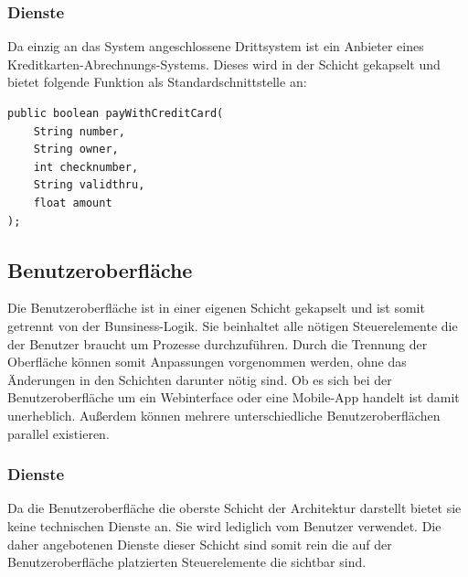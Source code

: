 \documentclass[a4paper,12pt]{article} %
\begin{document}
\subsubsection{Dienste}
Da einzig an das System angeschlossene Drittsystem ist ein Anbieter eines Kreditkarten-Abrechnungs-Systems. Dieses wird in der Schicht gekapselt und bietet folgende Funktion als Standardschnittstelle an:
\begin{lstlisting}
public boolean payWithCreditCard(
	String number, 
	String owner, 
	int checknumber, 
	String validthru, 
	float amount
);
\end{lstlisting}


\subsection{Benutzeroberfläche}
Die Benutzeroberfläche ist in einer eigenen Schicht gekapselt und ist somit getrennt von der Bunsiness-Logik. Sie beinhaltet alle nötigen Steuerelemente die der Benutzer braucht um Prozesse durchzuführen. Durch die Trennung der Oberfläche können somit Anpassungen vorgenommen werden, ohne das Änderungen in den Schichten darunter nötig sind. Ob es sich bei der Benutzeroberfläche um ein Webinterface oder eine Mobile-App handelt ist damit unerheblich. Außerdem können mehrere unterschiedliche Benutzeroberflächen parallel existieren.

\subsubsection{Dienste}
Da die Benutzeroberfläche die oberste Schicht der Architektur darstellt bietet sie keine technischen Dienste an. Sie wird lediglich vom Benutzer verwendet. Die daher angebotenen Dienste dieser Schicht sind somit rein die auf der Benutzeroberfläche platzierten Steuerelemente die sichtbar sind.
\end{document}
